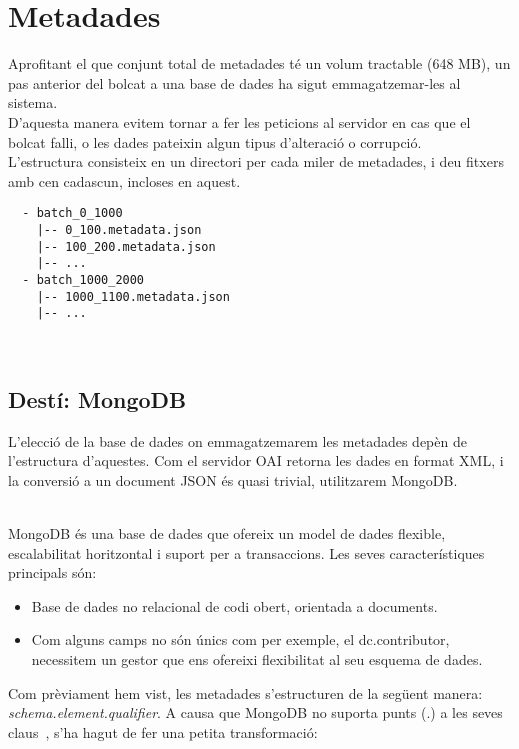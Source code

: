 \section{Metadades}\label{sec:metadata-storing}

Aprofitant el que conjunt total de metadades té un volum tractable (648 MB), un pas anterior del bolcat a una base de dades ha sigut emmagatzemar-les al sistema. \\

\noindent
D’aquesta manera evitem tornar a fer les peticions al servidor en cas que el bolcat falli, o les dades pateixin algun tipus d’alteració o corrupció. \\

\noindent
L’estructura consisteix en un directori per cada miler de metadades, i deu fitxers amb cen cadascun, incloses en aquest.

\begin{verbatim}
  - batch_0_1000
    |-- 0_100.metadata.json
    |-- 100_200.metadata.json
    |-- ...
  - batch_1000_2000
    |-- 1000_1100.metadata.json
    |-- ...
\end{verbatim}

\noindent \\
\subsection{Destí: MongoDB}\label{subsec:metadata-db-mongodb}

L'elecció de la base de dades on emmagatzemarem les metadades depèn de l'estructura d'aquestes.
Com el servidor \gls{OAI} retorna les dades en format \gls{XML}, i la conversió a un document \gls{JSON} és quasi trivial, utilitzarem MongoDB.

\noindent \\
MongoDB és una base de dades que ofereix un model de dades flexible, escalabilitat horitzontal i suport per a transaccions.
Les seves característiques principals són:

\begin{itemize}
  \item Base de dades no relacional de codi obert, orientada a documents.
  \item Com alguns camps no són únics com per exemple, el dc.contributor, necessitem un gestor que ens ofereixi flexibilitat al seu esquema de dades.
\end{itemize}

\noindent
Com prèviament hem vist, les metadades s’estructuren de la següent manera: \textit{schema.element.qualifier}.
A causa que MongoDB no suporta punts (.) a les seves claus~\cite{mongodb:key-restrictions}, s’ha hagut de fer una petita transformació:

